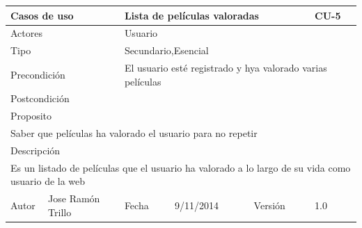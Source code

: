 \documentclass{article}
\begin{document}
\begin{table}[h]
\begin{tabular}{|l|l|l|l|l|l|}
\hline
\multicolumn{2}{|p{2cm}|}{Casos de uso}  & \multicolumn{3}{p{7cm}|}{\textbf{Lista de películas valoradas}} & CU-5 \\
\hline
\multicolumn{2}{|p{2cm}|}{Actores}       & \multicolumn{4}{p{8cm}|}{Usuario}        \\
\hline
\multicolumn{2}{|p{2cm}|}{Tipo}          & \multicolumn{4}{p{8cm}|}{Secundario,Esencial}        \\
\hline
\multicolumn{2}{|p{2cm}|}{Precondición}  & \multicolumn{4}{p{8cm}|}{El usuario esté registrado y hya valorado varias películas}        \\
\hline
\multicolumn{2}{|p{2cm}|}{Postcondición} & \multicolumn{4}{p{8cm}|}{}        \\
\hline
\multicolumn{6}{|p{10cm}|}{Proposito}                                   \\
\hline
\multicolumn{6}{|p{10cm}|}{Saber que películas ha valorado el usuario para no repetir}                                            \\
\hline
\multicolumn{6}{|p{10cm}|}{Descripción}                                 \\
\hline
\multicolumn{6}{|p{10cm}|}{Es un listado de películas que el usuario ha valorado a lo largo de su vida como usuario de la web}                                            \\
\hline
Autor              &       Jose Ramón Trillo       & Fecha    & 9/11/2014     &   Versión  &1.0\\
\hline
\end{tabular}
\end{table}
\end{document}
